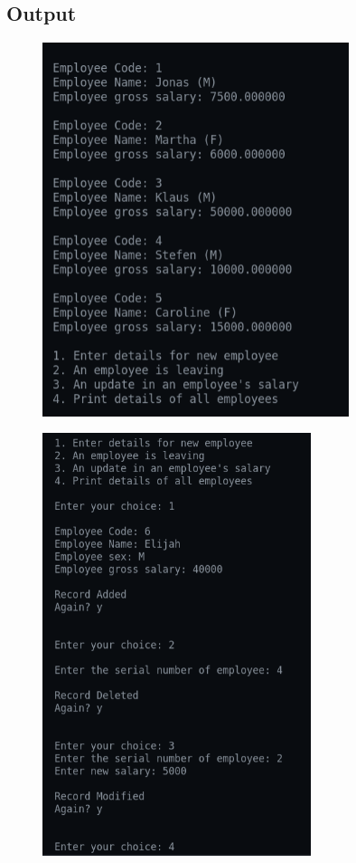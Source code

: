 \documentclass[12pt]{article}
\begin{document}
\subsection{Output}
\begin{figure}[h]
    \centering
    \includegraphics[width=0.8\textwidth]{7a.png}
\end{figure}
\newpage
\begin{figure}[h]
    \centering
    \includegraphics[width=0.7\textwidth]{7b.png}
\end{figure}
\end{document}
